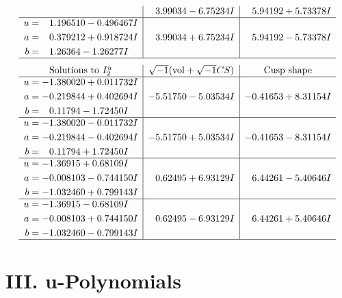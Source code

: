 \documentclass[1p]{elsarticle_modified}
\theoremstyle{definition}
\newcommand{\I}{\sqrt{-1}}
\begin{document}
$$\begin{array}{c|c|c}
 & \phantom{-}3.99034 - 6.75234 I & \phantom{-}5.94192 + 5.73378 I \\ \hline\begin{aligned}
u &= \phantom{-}1.196510 - 0.496467 I \\
a &= \phantom{-}0.379212 + 0.918724 I \\
b &= \phantom{-}1.26364 - 1.26277 I\end{aligned}
 & \phantom{-}3.99034 + 6.75234 I & \phantom{-}5.94192 - 5.73378 I\\
 \hline 
 \end{array}$$\newpage$$\begin{array}{c|c|c}  
\text{Solutions to }I^u_{2}& \I (\text{vol} + \sqrt{-1}CS) & \text{Cusp shape}\\
 \hline 
\begin{aligned}
u &= -1.380020 + 0.011732 I \\
a &= -0.219844 + 0.402694 I \\
b &= \phantom{-}0.11794 - 1.72450 I\end{aligned}
 & -5.51750 - 5.03534 I & -0.41653 + 8.31154 I \\ \hline\begin{aligned}
u &= -1.380020 - 0.011732 I \\
a &= -0.219844 - 0.402694 I \\
b &= \phantom{-}0.11794 + 1.72450 I\end{aligned}
 & -5.51750 + 5.03534 I & -0.41653 - 8.31154 I \\ \hline\begin{aligned}
u &= -1.36915 + 0.68109 I \\
a &= -0.008103 - 0.744150 I \\
b &= -1.032460 + 0.799143 I\end{aligned}
 & \phantom{-}0.62495 + 6.93129 I & \phantom{-}6.44261 - 5.40646 I \\ \hline\begin{aligned}
u &= -1.36915 - 0.68109 I \\
a &= -0.008103 + 0.744150 I \\
b &= -1.032460 - 0.799143 I\end{aligned}
 & \phantom{-}0.62495 - 6.93129 I & \phantom{-}6.44261 + 5.40646 I\\
 \hline 
 \end{array}$$\newpage
\newpage\renewcommand{\arraystretch}{1}
\centering \section*{ III. u-Polynomials}
\end{document}
